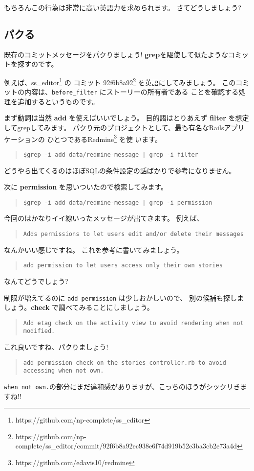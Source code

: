 \documentclass{jarticle}
\begin{document}
 もちろんこの行為は非常に高い英語力を求められます。
 さてどうしましょう?

  \subsection{パクる}
  既存のコミットメッセージをパクりましょう!
  {\bf grep}を駆使して似たようなコミットを探すのです。

  例えば、ss\_editor\footnote{https://github.com/np-complete/ss\_editor} の
  コミット 92f6b8a92\footnote{https://github.com/np-complete/ss\_editor/commit/92f6b8a92ec938e6f74d919b52e3ba3cb2e73a4d}
  を英語にしてみましょう。
  このコミットの内容は、{\tt before\_filter} にストーリーの所有者である
  ことを確認する処理を追加するというものです。

  まず動詞は当然 {\bf add} を使えばいいでしょう。
  目的語はとりあえず {\bf filter} を想定してgrepしてみます。
  パクり元のプロジェクトとして、最も有名なRailsアプリケーションの
  ひとつであるRedmine\footnote{https://github.com/edavis10/redmine} を使
  います。
  \begin{quote}
   {\tt \$grep -i add data/redmine-message | grep -i filter }
  \end{quote}
  どうやら出てくるのはほぼSQLの条件設定の話ばかりで参考になりません。

  次に {\bf permission} を思いついたので検索してみます。
  \begin{quote}
   {\tt \$grep -i add data/redmine-message | grep -i permission }
  \end{quote}

  今回のはかなりイイ線いったメッセージが出てきます。
  例えば、
  \begin{quote}
   {\tt Adds permissions to let users edit and/or delete their messages }
  \end{quote}
  なんかいい感じですね。
  これを参考に書いてみましょう。
  \begin{quote}
   {\tt add permission to let users access only their own stories }
  \end{quote}
  なんてどうでしょう?

  制限が増えてるのに {\tt add permission} は少しおかしいので、
  別の候補も探しましょう。{\bf check} で調べてみることにしましょう。

  \begin{quote}
   {\tt Add etag check on the activity view to avoid rendering when not
   modified.}
  \end{quote}
  これ良いですね、パクりましょう!
   \begin{quote}
    {\tt add permission check on the stories\_controller.rb to avoid accessing when not own.}
   \end{quote}
   {\tt when not own.}の部分にまだ違和感がありますが、こっちのほうがシックリきますね!!
\end{document}
